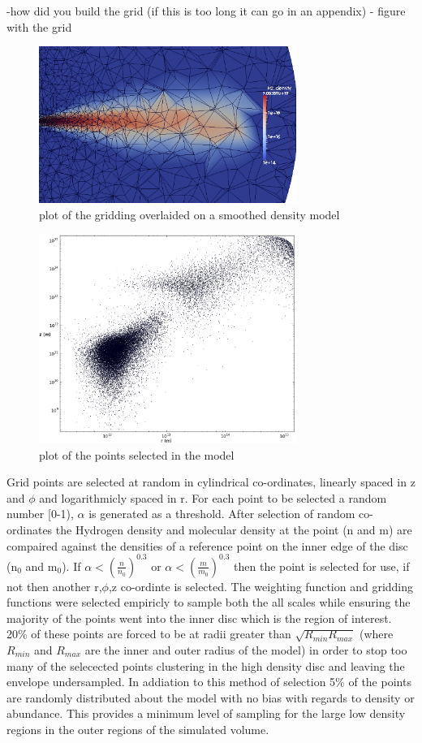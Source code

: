 \documentclass[useAMS,usenatbib]{mn2e}
\begin{document}
-how did you build the grid  (if this is too long it can go in an appendix)  - figure with the grid

\begin{figure}
 \includegraphics[width=84mm]{Figures/model/Lime_grid3.png}

 \caption{plot of the gridding overlaided on a smoothed density model}
\end{figure}

\begin{figure}
 \includegraphics[width=84mm]{Figures/model/lime_points_rz.png}

 \caption{plot of the points selected in the model}
\end{figure}

Grid points are selected at random in cylindrical co-ordinates, linearly spaced in z and $\phi$ and logarithmicly spaced in r. For each point to be selected a random number [0-1), $\alpha$ is generated as a threshold. After selection of random co-ordinates the Hydrogen density and molecular density at the point (n and m) are compaired against the densities of a reference point on the inner edge of the disc (n$_0$ and m$_0$). If $\alpha<\left( \frac{n}{n_0} \right)^{0.3}$ or $\alpha< \left( \frac{m}{m_0} \right)^{0.3}$ then the point is selected for use, if not then another r,$\phi$,z co-ordinte is selected. The weighting function and gridding functions were selected empiricly to sample both the all scales while ensuring the majority of the points went into the inner disc which is the region of interest. 20\% of these points are forced to be at radii greater than $\sqrt{R_{min}R_{max}}$ (where $R_{min}$ and $R_{max}$ are the inner and outer radius of the model) in order to stop too many of the selecected points clustering in the high density disc and leaving the envelope undersampled.
In addiation to this method of selection 5\% of the points are randomly distributed about the model with no bias with regards to density or abundance. This provides a minimum level of sampling for the large low density regions in the outer regions of the simulated volume.
\end{document}

